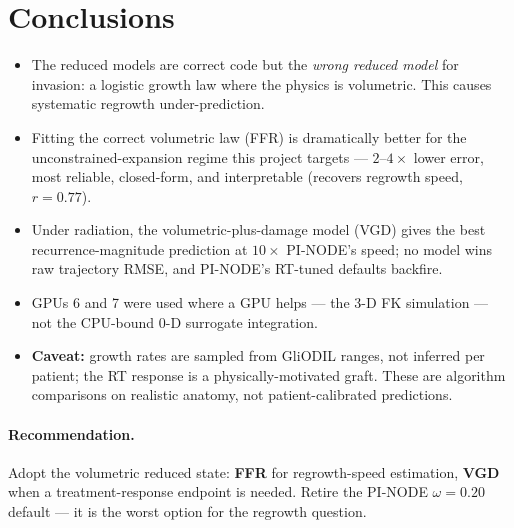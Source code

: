 \documentclass[11pt]{article}
\begin{document}
\section{Conclusions}
\begin{itemize}
\item The reduced models are correct code but the \emph{wrong reduced model} for
invasion: a logistic growth law where the physics is volumetric. This causes
systematic regrowth under-prediction.
\item Fitting the correct volumetric law (FFR) is dramatically better for the
unconstrained-expansion regime this project targets --- $2\text{--}4\times$ lower
error, most reliable, closed-form, and interpretable (recovers regrowth speed,
$r=0.77$).
\item Under radiation, the volumetric-plus-damage model (VGD) gives the best
recurrence-magnitude prediction at $10\times$ PI-NODE's speed; no model wins raw
trajectory RMSE, and PI-NODE's RT-tuned defaults backfire.
\item GPUs 6 and 7 were used where a GPU helps --- the 3-D FK simulation --- not
the CPU-bound 0-D surrogate integration.
\item \textbf{Caveat:} growth rates are sampled from GliODIL ranges, not
inferred per patient; the RT response is a physically-motivated graft. These are
algorithm comparisons on realistic anatomy, not patient-calibrated predictions.
\end{itemize}

\paragraph{Recommendation.} Adopt the volumetric reduced state: \textbf{FFR} for
regrowth-speed estimation, \textbf{VGD} when a treatment-response endpoint is
needed. Retire the PI-NODE $\omega{=}0.20$ default --- it is the worst option for
the regrowth question.
\end{document}

